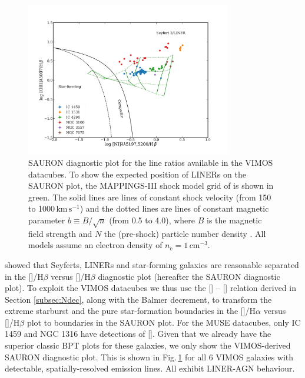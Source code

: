		\begin{figure}
			\centering
			\includegraphics[width=0.8\textwidth]{chapter5/SAURON.png}
			\caption[An alternative diagnostic plot]{SAURON diagnostic plot for the line ratios available in the VIMOS datacubes. To show the expected position of LINERs on the SAURON plot, the MAPPINGS-III shock model grid of \citet{Allen2008} is shown in green. The solid lines are lines of constant shock velocity (from 150 to 1000\,$\mathrm{km\,s^{-1}}$) and the dotted lines are lines of constant magnetic parameter $b \equiv B/\sqrt{n}$ (from 0.5 to 4.0), where $B$ is the magnetic field strength and $N$ the (pre-shock) particle number density \citep{Dopita1996}. All models assume an electron density of $n_\mathrm{e} = 1\,\mathrm{cm^{-3}}$.}
			\label{fig:SAURON}
		\end{figure}

		\citet{Sarzi2010} showed that Seyferts, LINERs and star-forming galaxies are reasonable separated in the []/H$\beta$ versus []/H$\beta$ diagnostic plot (hereafter the SAURON diagnostic plot). To exploit the VIMOS datacubes we thus use the [] -- [] relation derived in Section \ref{subsec:Ndec}, along with the Balmer decrement, to transform the \citet{Kewley2001} extreme starburst and the \citet{Kauffmann2003a} pure star-formation boundaries in the []/H$\alpha$ versus []/H$\beta$ plot to boundaries in the SAURON plot. For the MUSE datacubes, only IC 1459 and NGC 1316 have detections of []. Given that we already have the superior classic BPT plots for these galaxies, we only show the VIMOS-derived SAURON diagnostic plot. This is shown in Fig.\,\ref{fig:SAURON} for all 6 VIMOS galaxies with detectable, spatially-resolved emission lines. All exhibit LINER-AGN behaviour.

